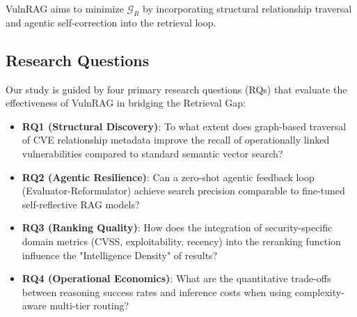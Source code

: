 VulnRAG aims to minimize $\mathcal{G}_R$ by incorporating structural relationship traversal and agentic self-correction into the retrieval loop.

\subsection{Research Questions}
Our study is guided by four primary research questions (RQs) that evaluate the effectiveness of VulnRAG in bridging the Retrieval Gap:
\begin{itemize}
    \item \textbf{RQ1 (Structural Discovery)}: To what extent does graph-based traversal of CVE relationship metadata improve the recall of operationally linked vulnerabilities compared to standard semantic vector search?
    \item \textbf{RQ2 (Agentic Resilience)}: Can a zero-shot agentic feedback loop (Evaluator-Reformulator) achieve search precision comparable to fine-tuned self-reflective RAG models?
    \item \textbf{RQ3 (Ranking Quality)}: How does the integration of security-specific domain metrics (CVSS, exploitability, recency) into the reranking function influence the "Intelligence Density" of results?
    \item \textbf{RQ4 (Operational Economics)}: What are the quantitative trade-offs between reasoning success rates and inference costs when using complexity-aware multi-tier routing?
\end{itemize}
